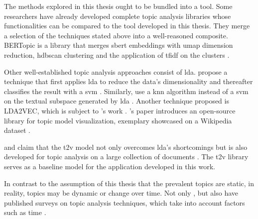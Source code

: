 The methods explored in this thesis ought to be bundled into a tool.
Some researchers have already developed complete topic analysis libraries whose functionalities can be compared to the tool developed in this thesis.
They merge a selection of the techniques stated above into a well-reasoned composite.
BERTopic is a library that merges \acs*{sbert} embeddings with \acs*{umap} dimension reduction, 
\acs*{hdbscan} clustering and the application of \acs*{tfidf} on the clusters \cite{bertopic2022}.

Other well-established topic analysis approaches consist of \acs*{lda}.
\citeauthor{lda2008} propose a technique that first applies \acs*{lda} to reduce the data's dimensionality 
and thereafter classifies the result with a \ac{svm} \cite{lda2008}.
Similarly, \citeauthor{LDA2016} use a \acs*{knn} algorithm instead of a \ac{svm} on the textual subspace generated by \acs*{lda} \cite{LDA2016}.
Another technique proposed is LDA2VEC, which is subject to \citeauthor{evolution_of_topic_modeling2022}'s work \cite{evolution_of_topic_modeling2022}.
\citeauthor{topic_modeling2021}'s paper introduces an open-source library for topic model visualization, 
exemplary showcased on a Wikipedia dataset \cite{topic_modeling2021}.

\citeauthor{Top2Vec2020} and \citeauthor{Topic2Vec2015} claim that the \acs*{t2v} model not only overcomes \acs*{lda}'s shortcomings \cite{Top2Vec2020, Topic2Vec2015}
but is also developed for topic analysis on a large collection of documents \cite{Top2Vec2020}.
The \acs*{t2v} library serves as a baseline model for the application developed in this work.

In contrast to the assumption of this thesis that the prevalent topics are static, in reality, topics may be dynamic or change over time.
Not only \citeauthor{topic_modeling2015}, but also \citeauthor{topic_modeling2020} have published surveys on topic analysis techniques, 
which take into account factors such as time \cite{topic_modeling2015, topic_modeling2020}.

